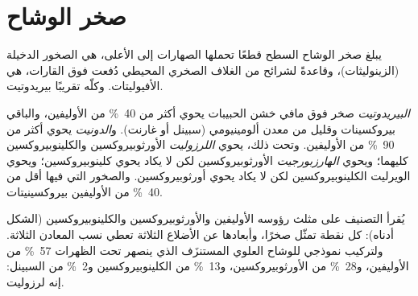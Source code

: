 \section{صخر الوشاح}\label{sec:b2:mantle-melting:rock}

يبلغ صخر الوشاح السطح قطعًا تحملها الصهارات إلى الأعلى، هي
الصخور الدخيلة (الزينوليثات)، وقاعدةً لشرائح من الغلاف الصخري المحيطي دُفعت فوق
القارات، هي الأفيوليتات. وكلّه تقريبًا بيريدوتيت.

\begin{definition}\label{def:b2:mantle-melting:peridotites}
\emph{البيريدوتيت} صخر فوق مافي خشن الحبيبات
يحوي أكثر من \qty{40}{\percent} من الأوليفين، والباقي بيروكسينات
وقليل من معدن ألومينيومي (سبينل أو غارنت).
و\emph{الدونيت} يحوي أكثر من \qty{90}{\percent} من الأوليفين. وتحت
ذلك، يحوي \emph{اللرزوليت} الأورثوبيروكسين
والكلينوبيروكسين كليهما؛ ويحوي \emph{الهارزبورجيت} الأورثوبيروكسين لكن
لا يكاد يحوي كلينوبيروكسين؛ ويحوي الويرليت الكلينوبيروكسين لكن لا يكاد يحوي
أورثوبيروكسين. والصخور التي فيها أقل من \qty{40}{\percent} من الأوليفين بيروكسينيتات.
\end{definition}

يُقرأ التصنيف على مثلث رؤوسه الأوليفين
والأورثوبيروكسين والكلينوبيروكسين (الشكل أدناه): كل نقطة تمثّل صخرًا،
وأبعادها عن الأضلاع الثلاثة تعطي نسب المعادن
الثلاثة. ولتركيب نموذجي للوشاح العلوي المستنزَف الذي ينصهر تحت
الظهرات \qty{57}{\percent} من الأوليفين،
و\qty{28}{\percent} من الأورثوبيروكسين، و\qty{13}{\percent} من الكلينوبيروكسين
و\qty{2}{\percent} من السبينل: إنه لرزوليت.

